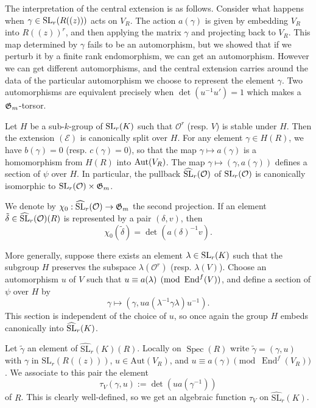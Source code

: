 \documentclass[12pt]{article}
\begin{document}
\begin{remark}
    The interpretation of the central extension is as follows. Consider what happens when $\gamma \in \operatorname{SL}_r(R((z)))$ acts on $V_R$. The action $a(\gamma)$ is given by embedding $V_R$ into $R((z))^r$, and then applying the matrix $\gamma$ and projecting back to $V_R$. This map determined by $\gamma$ fails to be an automorphism, but we showed that if we perturb it by a finite rank endomorphism, we can get an automorphism. However we can get different automorphisms, and the central extension carries around the data of the particular automorphism we choose to represent the element $\gamma$. Two automorphisms are equivalent precisely when $\det(u^{-1}u') = 1$ which makes a $\mathfrak{G}_m$-torsor.
\end{remark}

\begin{remark}
    Let $H$ be a sub-$k$-group of $\operatorname{SL}_r(K)$ such that $\mathcal{O}^r$ (resp. $V$) is stable under $H$. Then the extension $(\mathcal{E})$ is canonically split over $H$. For any element $\gamma \in H(R)$, we have $b(\gamma) = 0$ (resp. $c(\gamma) = 0$), so that the map $\gamma \mapsto a(\gamma)$ is a homomorphism from $H(R)$ into $\operatorname{Aut}(V_R)$. The map $\gamma \mapsto (\gamma, a(\gamma))$ defines a section of $\psi$ over $H$. In particular, the pullback $\widehat{\operatorname{SL}}_r(\mathcal{O})$ of $\operatorname{SL}_r(\mathcal{O})$ is canonically isomorphic to $\operatorname{SL}_r(\mathcal{O}) \times \mathfrak{G}_m$.

    We denote by $\chi_0: \widehat{\operatorname{SL}}_r(\mathcal{O}) \to \mathfrak{G}_m$ the second projection. If an element $\tilde{\delta} \in \widehat{\operatorname{SL}}_r(\mathcal{O})(R)$ is represented by a pair $(\delta, v)$, then
    \[
        \chi_0(\tilde{\delta}) = \det(a(\delta)^{-1} v).
    \]

    More generally, suppose there exists an element $\lambda \in \operatorname{SL}_r(K)$ such that the subgroup $H$ preserves the subspace $\lambda(\mathcal{O}^r)$ (resp. $\lambda(V)$). Choose an automorphism $u$ of $V$ such that $u \equiv a(\lambda) \pmod{\operatorname{End}^f(V)}$, and define a section of $\psi$ over $H$ by
    \[
        \gamma \mapsto (\gamma, ua(\lambda^{-1} \gamma \lambda)u^{-1}).
    \]
    This section is independent of the choice of $u$, so once again the group $H$ embeds canonically into $\widehat{\operatorname{SL}}_r(K)$.
\end{remark}

Let $\tilde{\gamma}$ an element of \( \widehat{\mathrm{SL}}_r(K)(R) \). Locally on \( \operatorname{Spec}(R) \) write \( \tilde{\gamma} = (\gamma, u) \) with \( \gamma \) in \( \mathrm{SL}_r(R((z))) \), \( u \in \mathrm{Aut}(V_R) \), and \( u \equiv a(\gamma) \pmod{\operatorname{End}^f(V_R)} \). We associate to this pair the element
\[
    \tau_V(\gamma, u) := \det(u a(\gamma^{-1}))
\]
of \( R \). This is clearly well-defined, so we get an algebraic function \( \tau_V \) on \( \widehat{\mathrm{SL}}_r(K) \).
\end{document}

